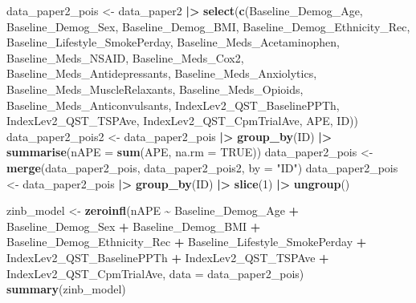 \documentclass[
  12pt,
]{article}
\newenvironment{Shaded}{\begin{snugshade}}{\end{snugshade}}
\newcommand{\AttributeTok}[1]{\textcolor[rgb]{0.13,0.29,0.53}{#1}}
\newcommand{\ConstantTok}[1]{\textcolor[rgb]{0.56,0.35,0.01}{#1}}
\newcommand{\DecValTok}[1]{\textcolor[rgb]{0.00,0.00,0.81}{#1}}
\newcommand{\FunctionTok}[1]{\textcolor[rgb]{0.13,0.29,0.53}{\textbf{#1}}}
\newcommand{\NormalTok}[1]{#1}
\newcommand{\OtherTok}[1]{\textcolor[rgb]{0.56,0.35,0.01}{#1}}
\newcommand{\SpecialCharTok}[1]{\textcolor[rgb]{0.81,0.36,0.00}{\textbf{#1}}}
\newcommand{\StringTok}[1]{\textcolor[rgb]{0.31,0.60,0.02}{#1}}
\begin{document}
\begin{Shaded}
\begin{Highlighting}[]
\NormalTok{data\_paper2\_pois }\OtherTok{\textless{}{-}}\NormalTok{ data\_paper2 }\SpecialCharTok{|\textgreater{}}
  \FunctionTok{select}\NormalTok{(}\FunctionTok{c}\NormalTok{(Baseline\_Demog\_Age, Baseline\_Demog\_Sex, }
\NormalTok{           Baseline\_Demog\_BMI, Baseline\_Demog\_Ethnicity\_Rec, }
\NormalTok{           Baseline\_Lifestyle\_SmokePerday, Baseline\_Meds\_Acetaminophen, }
\NormalTok{           Baseline\_Meds\_NSAID, Baseline\_Meds\_Cox2, }
\NormalTok{           Baseline\_Meds\_Antidepressants, Baseline\_Meds\_Anxiolytics,}
\NormalTok{           Baseline\_Meds\_MuscleRelaxants, Baseline\_Meds\_Opioids, }
\NormalTok{           Baseline\_Meds\_Anticonvulsants, IndexLev2\_QST\_BaselinePPTh, }
\NormalTok{           IndexLev2\_QST\_TSPAve, IndexLev2\_QST\_CpmTrialAve, APE, ID))}
\NormalTok{data\_paper2\_pois2 }\OtherTok{\textless{}{-}}\NormalTok{ data\_paper2\_pois }\SpecialCharTok{|\textgreater{}}
  \FunctionTok{group\_by}\NormalTok{(ID) }\SpecialCharTok{|\textgreater{}}
  \FunctionTok{summarise}\NormalTok{(}\AttributeTok{nAPE =} \FunctionTok{sum}\NormalTok{(APE, }\AttributeTok{na.rm =} \ConstantTok{TRUE}\NormalTok{)) }
\NormalTok{data\_paper2\_pois }\OtherTok{\textless{}{-}} \FunctionTok{merge}\NormalTok{(data\_paper2\_pois, data\_paper2\_pois2, }\AttributeTok{by =} \StringTok{"ID"}\NormalTok{)}
\NormalTok{data\_paper2\_pois }\OtherTok{\textless{}{-}}\NormalTok{ data\_paper2\_pois }\SpecialCharTok{|\textgreater{}}
  \FunctionTok{group\_by}\NormalTok{(ID) }\SpecialCharTok{|\textgreater{}}
  \FunctionTok{slice}\NormalTok{(}\DecValTok{1}\NormalTok{) }\SpecialCharTok{|\textgreater{}}
  \FunctionTok{ungroup}\NormalTok{()}

\NormalTok{zinb\_model }\OtherTok{\textless{}{-}} \FunctionTok{zeroinfl}\NormalTok{(nAPE }\SpecialCharTok{\textasciitilde{}}\NormalTok{ Baseline\_Demog\_Age }\SpecialCharTok{+}\NormalTok{ Baseline\_Demog\_Sex }\SpecialCharTok{+} 
\NormalTok{           Baseline\_Demog\_BMI }\SpecialCharTok{+}\NormalTok{ Baseline\_Demog\_Ethnicity\_Rec }\SpecialCharTok{+} 
\NormalTok{           Baseline\_Lifestyle\_SmokePerday }\SpecialCharTok{+}\NormalTok{ IndexLev2\_QST\_BaselinePPTh }\SpecialCharTok{+} 
\NormalTok{           IndexLev2\_QST\_TSPAve }\SpecialCharTok{+}\NormalTok{ IndexLev2\_QST\_CpmTrialAve, }\AttributeTok{data =}\NormalTok{ data\_paper2\_pois)}
\FunctionTok{summary}\NormalTok{(zinb\_model)}
\end{Highlighting}
\end{Shaded}
\end{document}
